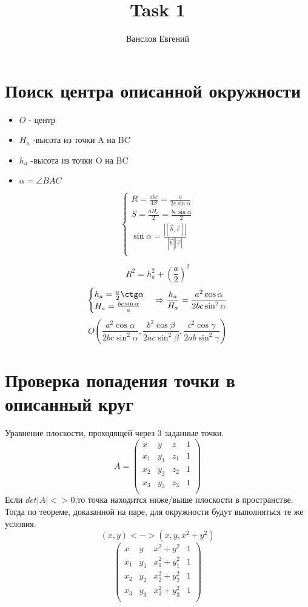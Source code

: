 \documentclass[14pt]{article} %
\title{Task 1}
\author{Ванслов Евгений}
\date{}
\begin{document}
\maketitle
\section{Поиск центра описанной окружности}
\begin{itemize}
\item $O$ - центр
\item $H_a$ -высота из точки A на BC
\item $h_a$ -высота из точки O на BC
\item $\alpha = \angle BAC$
\end{itemize}
$$\begin{cases} 
	R=\frac{abc}{4S}=\frac{a}{2e\sin \alpha} \\
	S=\frac{aH_a}{2}=\frac{bc\sin\alpha}{2} \\
	\sin\alpha=\frac{|[\vec{b},\vec{c}]|}{|\vec{b}||\vec{c}|} \\
\end{cases}$$

$$R^2=h_a^2+(\frac{a}{2})^2$$
$$\begin{cases} 
	h_a=\frac{a}{2}\ctg \alpha \\
	H_a=\frac{bc\sin\alpha}{a} \\
\end{cases}
\Rightarrow\frac{h_a}{H_a}=\frac{a^2\cos\alpha}{2bc\sin^2\alpha}$$
$$O(\frac{a^2\cos\alpha}{2bc\sin^2\alpha},
	\frac{b^2\cos\beta}{2ac\sin^2\beta},
	\frac{c^2\cos\gamma}{2ab\sin^2\gamma})$$

\section{Проверка попадения точки в описанный круг}
Уравнение плоскости, проходящей через 3 заданные точки.
$$ A = 
\begin{pmatrix}
x & y & z & 1 \\
x_1 & y_1 & z_1 & 1 \\
x_2 & y_2 & z_2 & 1 \\
x_3 & y_3 & z_3 & 1 \\
\end{pmatrix}
$$
Если $det|A| <> 0$,то точка находится ниже/выше плоскости в пространстве. Тогда по теореме, доказанной на паре, для окружности будут выполняться те же условия.
$$(x,y) <-> (x,y, x^2 + y^2)$$
$$
\begin{pmatrix}
x & y & x^2 + y^2 & 1 \\
x_1 & y_1 & x_1^2 + y_1^2 & 1 \\
x_2 & y_2 & x_2^2 + y_2^2 & 1 \\
x_3 & y_3 & x_3^2 + y_3^2 & 1 \\
\end{pmatrix}
$$
\end{document}
